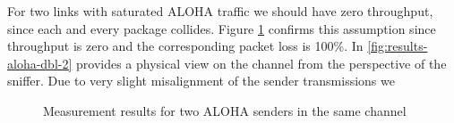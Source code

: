 For two links with saturated ALOHA traffic we should have zero throughput, since each and every package collides. Figure \ref{fig:results-aloha-dbl-1} confirms this assumption since throughput is zero and the corresponding packet loss is 100\%.
In \ref{fig:results-aloha-dbl-2} provides a physical view on the channel from the perspective of the sniffer. Due to very slight misalignment of the sender transmissions we 
\begin{figure}[tb]
	\label{fig:results-aloha-dbl-1}
	\begin{center}
		\centerline{
		}		
	\end{center}
	\caption{Measurement results for two ALOHA senders in the same channel}
\end{figure} 


